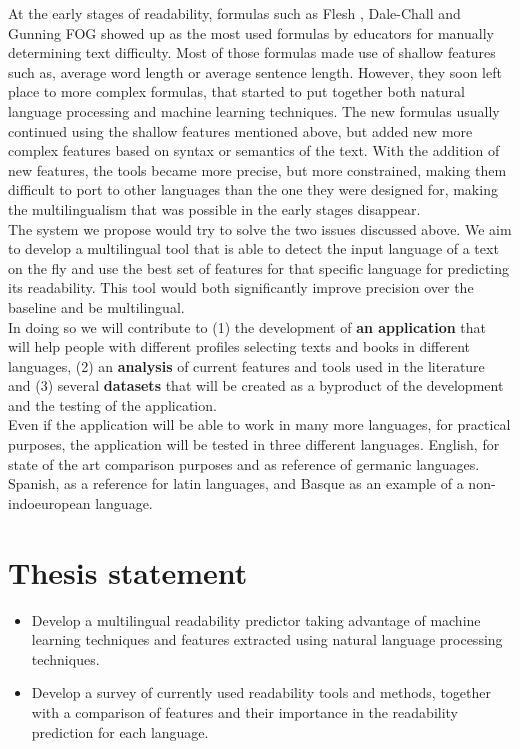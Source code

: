 \documentclass[12pt]{article}
\begin{document}
At the early stages of readability, formulas such as Flesh \cite{flesch1948new}, Dale-Chall \cite{chall1995readability} and Gunning FOG  \cite{albright1996readability} showed up as the most used formulas by educators for manually determining text difficulty. Most of those formulas made use of shallow features such as, average word length or average sentence length. However, they soon left place to more complex formulas\cite{franccois2012ai}\cite{aluisio2010readability}, that started to put together both natural language processing and machine learning techniques. The new formulas usually continued using the shallow  features  mentioned above, but added new more complex features based on syntax or semantics of the text. With the addition of new features, the tools became more precise, but more constrained, making them difficult to port to other languages than the one they were designed for, making the multilingualism that was possible in the early stages disappear.  \\


The system we propose would try to solve the two issues discussed above. We aim to develop a multilingual tool that is able to detect the input language of a text on the fly and use the best set of features for that specific language for predicting its readability. This tool would both significantly improve precision over the baseline and be multilingual.\\

In doing so we will contribute to (1) the development of \textbf{an application} that will help people with different profiles selecting texts and books in different languages, (2) an \textbf{analysis} of current features and tools used in the literature and (3) several \textbf{datasets} that will be created as a byproduct of the development and the testing of the application.\\

Even if the application will be able to work in many more languages, for practical purposes, the application will be tested in three different languages. English, for state of the art comparison purposes and as reference of germanic languages. Spanish, as a reference for latin languages, and Basque as an example of a non-indoeuropean language.



\section{Thesis statement}
\begin{itemize}
\item Develop a multilingual readability predictor taking advantage of machine learning techniques and features extracted using natural language processing techniques.
\item Develop a survey of currently used readability tools and methods, together with a comparison of features and their importance in the readability prediction for each language.

\end{itemize}
\end{document}
